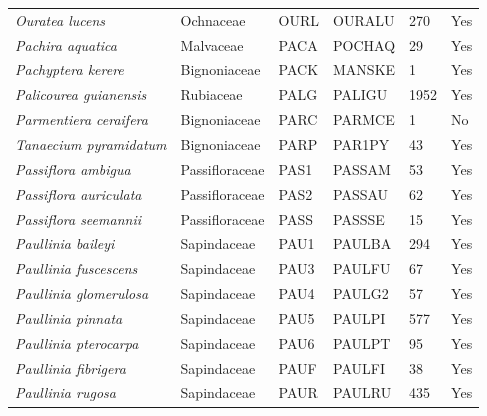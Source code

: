 \documentclass[11pt]{article}
\begin{document}
\begin{longtable}{@{}llllll@{}}
\textit{Ouratea lucens}                               & Ochnaceae        & OURL   & OURALU & 270             & Yes       \\
\textit{Pachira aquatica}                             & Malvaceae        & PACA   & POCHAQ & 29              & Yes       \\
\textit{Pachyptera kerere}                            & Bignoniaceae     & PACK   & MANSKE & 1               & Yes       \\
\textit{Palicourea guianensis}                        & Rubiaceae        & PALG   & PALIGU & 1952            & Yes       \\
\textit{Parmentiera ceraifera}                        & Bignoniaceae     & PARC   & PARMCE & 1               & No        \\
\textit{Tanaecium pyramidatum}                        & Bignoniaceae     & PARP   & PAR1PY & 43              & Yes       \\
\textit{Passiflora ambigua}                           & Passifloraceae   & PAS1   & PASSAM & 53              & Yes       \\
\textit{Passiflora auriculata}                        & Passifloraceae   & PAS2   & PASSAU & 62              & Yes       \\
\textit{Passiflora seemannii}                         & Passifloraceae   & PASS   & PASSSE & 15              & Yes       \\
\textit{Paullinia baileyi}                            & Sapindaceae      & PAU1   & PAULBA & 294             & Yes       \\
\textit{Paullinia fuscescens}                         & Sapindaceae      & PAU3   & PAULFU & 67              & Yes       \\
\textit{Paullinia glomerulosa}                        & Sapindaceae      & PAU4   & PAULG2 & 57              & Yes       \\
\textit{Paullinia pinnata}                            & Sapindaceae      & PAU5   & PAULPI & 577             & Yes       \\
\textit{Paullinia pterocarpa}                         & Sapindaceae      & PAU6   & PAULPT & 95              & Yes       \\
\textit{Paullinia fibrigera}                          & Sapindaceae      & PAUF   & PAULFI & 38              & Yes       \\
\textit{Paullinia rugosa}                             & Sapindaceae      & PAUR   & PAULRU & 435             & Yes       \\

\end{longtable}
\end{document}
